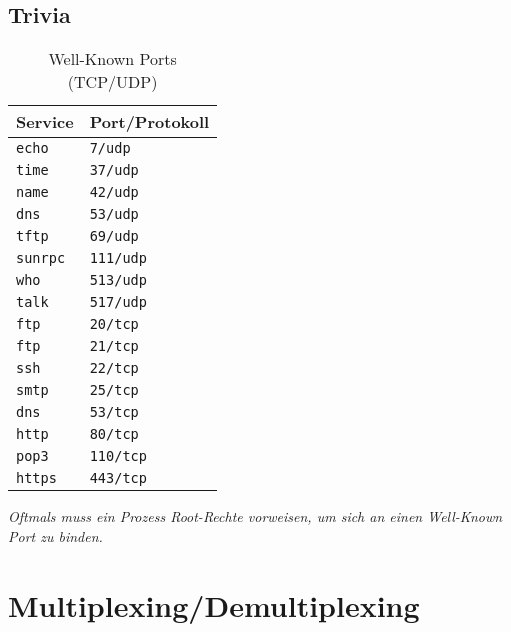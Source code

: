         \subsection{Trivia}
            \begin{table}[H]
            	\centering
            	\begin{tabular}{l | l}
            		Service         & Port/Protokoll   \\ \hline
            		\texttt{echo}   & \texttt{7/udp}   \\
            		\texttt{time}   & \texttt{37/udp}  \\
            		\texttt{name}   & \texttt{42/udp}  \\
            		\texttt{dns}    & \texttt{53/udp}  \\
            		\texttt{tftp}   & \texttt{69/udp}  \\
            		\texttt{sunrpc} & \texttt{111/udp} \\
            		\texttt{who}    & \texttt{513/udp} \\
            		\texttt{talk}   & \texttt{517/udp} \\ \hline
            		\texttt{ftp}    & \texttt{20/tcp}  \\
            		\texttt{ftp}    & \texttt{21/tcp}  \\
            		\texttt{ssh}    & \texttt{22/tcp}  \\
            		\texttt{smtp}   & \texttt{25/tcp}  \\
            		\texttt{dns}    & \texttt{53/tcp}  \\
            		\texttt{http}   & \texttt{80/tcp}  \\
            		\texttt{pop3}   & \texttt{110/tcp} \\
            		\texttt{https}  & \texttt{443/tcp}
            	\end{tabular}
            	\caption{Well-Known Ports (TCP/UDP)}
            \end{table}
            
            \textit{Oftmals muss ein Prozess Root-Rechte vorweisen, um sich an einen Well-Known Port zu binden.}

    \section{Multiplexing/Demultiplexing}
        \label{sec:demultiplexing}
    
